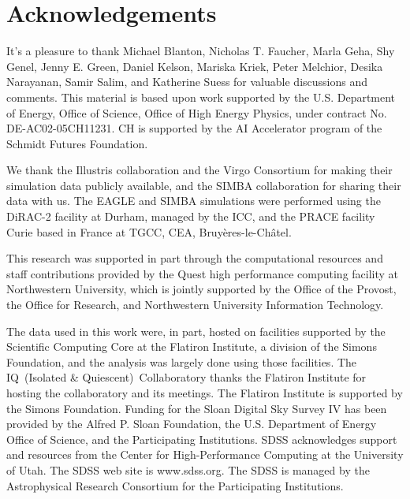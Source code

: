 \documentclass{aastex63}
\begin{document}
\NewPageAfterKeywords


 






\section*{Acknowledgements}
It's a pleasure to thank 
    Michael Blanton, 
    Nicholas T. Faucher, 
    Marla Geha, 
    Shy Genel,
    Jenny E. Green,
    Daniel Kelson, 
    Mariska Kriek, 
    Peter Melchior, 
    Desika Narayanan, 
    Samir Salim, 
    and Katherine Suess for
valuable discussions and comments.
This material is based upon work supported by the U.S. Department of Energy,
Office of Science, Office of High Energy Physics, under contract No.
DE-AC02-05CH11231. 
CH is supported by the AI Accelerator program of the Schmidt Futures Foundation.

We thank the Illustris collaboration and the Virgo Consortium for making their
simulation data publicly available, and the SIMBA collaboration for sharing
their data with us.
The EAGLE and SIMBA simulations were performed using the DiRAC-2 facility at
Durham, managed by the ICC, and the PRACE facility Curie based in France at
TGCC, CEA, Bruy\`{e}res-le-Ch\^{a}tel.

This research was supported in part through the computational resources and
staff contributions provided by the Quest high performance computing facility
at Northwestern University, which is jointly supported by the Office of the
Provost, the Office for Research, and Northwestern University Information
Technology. 

The data used in this work were, in part, hosted on facilities supported by the
Scientific Computing Core at the Flatiron Institute, a division of the Simons
Foundation, and the analysis was largely done using those facilities.
The IQ~(Isolated \& Quiescent)~Collaboratory thanks the Flatiron Institute for hosting the collaboratory and its meetings. 
The Flatiron Institute is supported by the Simons Foundation.
Funding for the Sloan Digital Sky Survey IV has been provided by the Alfred P.
Sloan Foundation, the U.S. Department of Energy Office of Science, and the
Participating Institutions. SDSS acknowledges support and resources from the
Center for High-Performance Computing at the University of Utah. The SDSS web
site is www.sdss.org.
The SDSS is managed by the Astrophysical Research Consortium for the
Participating Institutions.

\appendix
%
% 
 



 

\allauthors
\end{document}
